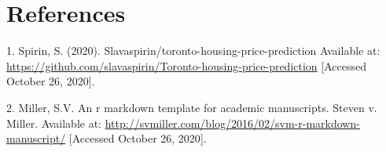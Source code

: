 \documentclass[11pt,]{article}
\begin{document}
\hypertarget{references}{%
\section{References}\label{references}}

\noindent

\hypertarget{refs}{}
\leavevmode\hypertarget{ref-spirin_slavaspirintoronto-housing-price-prediction_2020}{}%
1. Spirin, S. (2020). Slavaspirin/toronto-housing-price-prediction
Available at:
\url{https://github.com/slavaspirin/Toronto-housing-price-prediction}
{[}Accessed October 26, 2020{]}.

\leavevmode\hypertarget{ref-miller_r_nodate}{}%
2. Miller, S.V. An r markdown template for academic manuscripts. Steven
v. Miller. Available at:
\url{http://svmiller.com/blog/2016/02/svm-r-markdown-manuscript/}
{[}Accessed October 26, 2020{]}.





\newpage
\singlespacing 
\end{document}
